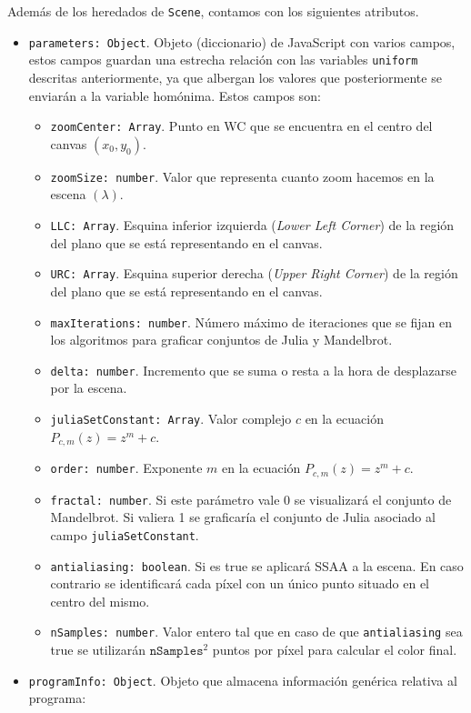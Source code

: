 Además de los heredados de \verb|Scene|, contamos con los siguientes atributos.
\begin{itemize}
    \item \verb|parameters: Object|. Objeto (diccionario) de JavaScript con varios campos, estos campos guardan una estrecha relación con las variables \verb|uniform| descritas anteriormente, ya que albergan los valores que posteriormente se enviarán a la variable homónima. Estos campos son:
    \begin{itemize}
        \item \verb|zoomCenter: Array|. Punto en WC que se encuentra en el centro del canvas $(x_0,y_0)$.
        \item \verb|zoomSize: number|. Valor que representa cuanto zoom hacemos en la escena $(\lambda)$.
        \item \verb|LLC: Array|. Esquina inferior izquierda (\textit{Lower Left Corner}) de la región del plano que se está representando en el canvas.
        \item \verb|URC: Array|. Esquina superior derecha (\textit{Upper Right Corner}) de la región del plano que se está representando en el canvas.
        \item \verb|maxIterations: number|. Número máximo de iteraciones que se fijan en los algoritmos para graficar conjuntos de Julia y Mandelbrot.
        \item \verb|delta: number|. Incremento que se suma o resta a la hora de desplazarse por la escena.
        \item \verb|juliaSetConstant: Array|. Valor complejo $c$ en la ecuación $P_{c,m}(z)=z^m + c$.
        \item \verb|order: number|. Exponente $m$ en la ecuación $P_{c,m}(z) = z^m + c$.
        \item \verb|fractal: number|. Si este parámetro vale 0 se visualizará el conjunto de Mandelbrot. Si valiera 1 se graficaría el conjunto de Julia asociado al campo \verb|juliaSetConstant|.
        \item \verb|antialiasing: boolean|. Si es true se aplicará SSAA a la escena. En caso contrario se identificará cada píxel con un único punto situado en el centro del mismo.
        \item \verb|nSamples: number|. Valor entero tal que en caso de que \verb|antialiasing| sea true se utilizarán $\mathtt{nSamples}^2$ puntos por píxel para calcular el color final. 
    \end{itemize}
    \item \verb|programInfo: Object|. Objeto que almacena información genérica relativa al programa:

\end{itemize}
